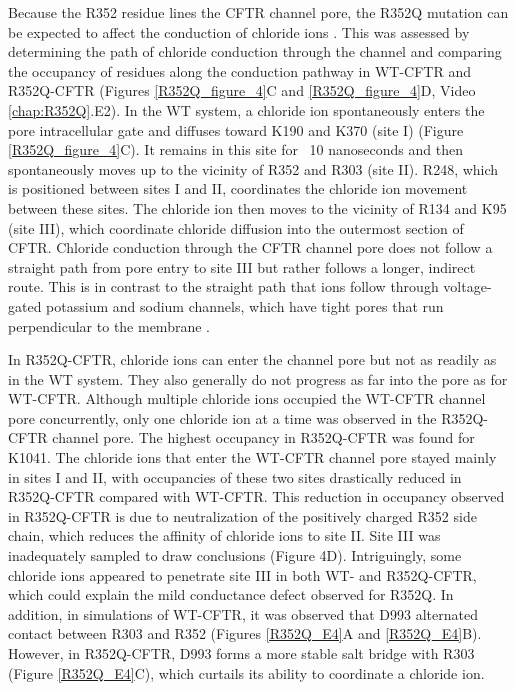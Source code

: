 Because the R352 residue lines the CFTR channel pore, the R352Q mutation can be expected to affect the conduction of chloride ions \cite{zhang2018}. This was assessed by determining the path of chloride conduction through the channel and comparing the occupancy of residues along the conduction pathway in WT-CFTR and R352Q-CFTR (Figures \ref{R352Q_figure_4}C and \ref{R352Q_figure_4}D, Video \ref{chap:R352Q}.E2). In the WT system, a chloride ion spontaneously enters the pore intracellular gate \cite{linsdell2018} and diffuses toward K190 and K370 (site I) (Figure \ref{R352Q_figure_4}C). It remains in this site for ~10 nanoseconds and then spontaneously moves up to the vicinity of R352 and R303 (site II). R248, which is positioned between sites I and II, coordinates the chloride ion movement between these sites. The chloride ion then moves to the vicinity of R134 and K95 (site III), which coordinate chloride diffusion into the outermost section of CFTR. Chloride conduction through the CFTR channel pore does not follow a straight path from pore entry to site III but rather follows a longer, indirect route. This is in contrast to the straight path that ions follow through voltage-gated potassium and sodium channels, which have tight pores that run perpendicular to the membrane \cite{flood2019}.

In R352Q-CFTR, chloride ions can enter the channel pore but not as readily as in the WT system. They also generally do not progress as far into the pore as for WT-CFTR. Although multiple chloride ions occupied the WT-CFTR channel pore concurrently, only one chloride ion at a time was observed in the R352Q-CFTR channel pore. The highest occupancy in R352Q-CFTR was found for K1041. The chloride ions that enter the WT-CFTR channel pore stayed mainly in sites I and II, with occupancies of these two sites drastically reduced in R352Q-CFTR compared with WT-CFTR. This reduction in occupancy observed in R352Q-CFTR is due to neutralization of the positively charged R352 side chain, which reduces the affinity of chloride ions to site II. Site III was inadequately sampled to draw conclusions (Figure 4D). Intriguingly, some chloride ions appeared to penetrate site III in both WT- and R352Q-CFTR, which could explain the mild conductance defect observed for R352Q. In addition, in simulations of WT-CFTR, it was observed that D993 alternated contact between R303 and R352 (Figures \ref{R352Q_E4}A and \ref{R352Q_E4}B). However, in R352Q-CFTR, D993 forms a more stable salt bridge with R303 (Figure \ref{R352Q_E4}C), which curtails its ability to coordinate a chloride ion.

